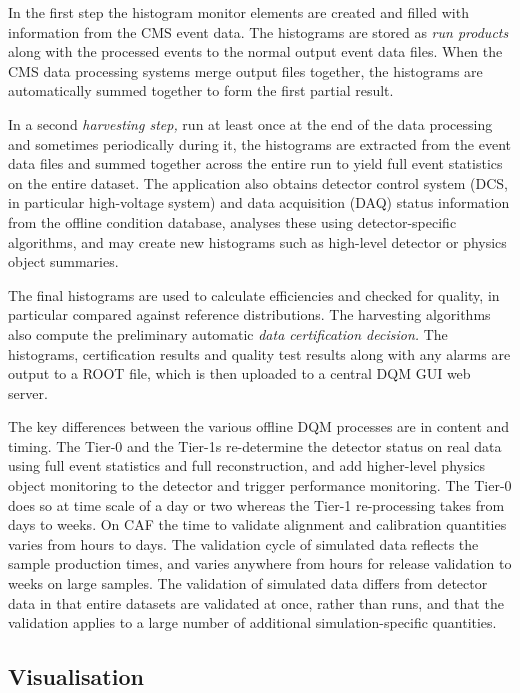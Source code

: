 \documentclass[a4paper]{jpconf}
\begin{document}
In the first step the histogram monitor elements are created and filled with
information from the CMS event data.  The histograms are stored as {\em run
  products} along with the processed events to the normal output event data
files.  When the CMS data processing systems merge output files together, the
histograms are automatically summed together to form the first partial result.

In a second {\em harvesting step,} run at least once at the end of the data
processing and sometimes periodically during it, the histograms are extracted
from the event data files and summed together across the entire run to yield
full event statistics on the entire dataset.  The application also obtains
detector control system (DCS, in particular high-voltage system) and data
acquisition (DAQ) status information from the offline condition database,
analyses these using detector-specific algorithms, and may create new
histograms such as high-level detector or physics object summaries.

The final histograms are used to calculate efficiencies and checked for
quality, in particular compared against reference distributions.  The
harvesting algorithms also compute the preliminary automatic {\em data
  certification decision.}  The histograms, certification results and quality
test results along with any alarms are output to a ROOT file, which is then
uploaded to a central DQM GUI web server.

The key differences between the various offline DQM processes are in content
and timing.  The Tier-0 and the Tier-1s re-determine the detector status on
real data using full event statistics and full reconstruction, and add
higher-level physics object monitoring to the detector and trigger performance
monitoring.  The Tier-0 does so at time scale of a day or two whereas the
Tier-1 re-processing takes from days to weeks.  On CAF the time to validate
alignment and calibration quantities varies from hours to days.  The
validation cycle of simulated data reflects the sample production times, and
varies anywhere from hours for release validation to weeks on large samples.
The validation of simulated data differs from detector data in that entire
datasets are validated at once, rather than runs, and that the validation
applies to a large number of additional simulation-specific quantities.

\subsection{Visualisation}
\end{document}
